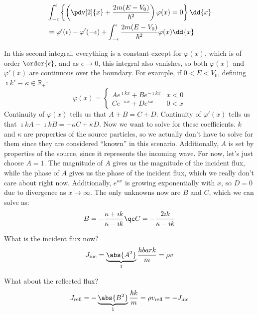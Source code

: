 \documentclass[a4paper,twoside,master.tex]{subfiles}
\begin{document}
\begin{align}\label{eq:barrier_integral}
    &\int_{-\epsilon}^{\epsilon} \left\{ \left(\pdv[2]{x} + \frac{2m(E-V_0)}{\hbar^2} \right) \varphi(x) = 0\right\} \dd{x}\\
    &= \varphi'(\epsilon) - \varphi'(-\epsilon) + \int_{- \epsilon}^{\epsilon} \frac{2m(E-V_0)}{\hbar^2} \varphi(x) \dd{x}
\end{align}

In this second integral, everything is a constant except for $ \varphi(x) $, which is of order $ \order{\epsilon} $, and as $ \epsilon \to 0 $, this integral also vanishes, so both $ \varphi(x) $ and $ \varphi'(x) $ are continuous over the boundary. For example, if $ 0 < E < V_0 $, defining $ \imath k' \equiv \kappa \in \mathbb{R}_+ $:
\begin{equation}
    \varphi(x) = 
    \begin{cases}
        A e^{\imath k x} + B e^{-\imath k x} & x<0\\
        C e^{-\kappa x} + D e^{\kappa x} & 0 < x
    \end{cases}
\end{equation}
Continuity of $ \varphi(x) $ tells us that $ A+B = C+D $. Continuity of $ \varphi'(x) $ tells us that $ \imath k A - \imath k B = - \kappa C + \kappa D $. Now we want to solve for these coefficients. $ k $ and $ \kappa $ are properties of the source particles, so we actually don't have to solve for them since they are considered ``known'' in this scenario. Additionally, $ A $ is set by properties of the source, since it represents the incoming wave. For now, let's just choose $ A = 1 $. The magnitude of $ A $ gives us the magnitude of the incident flux, while the phase of $ A $ gives us the phase of the incident flux, which we really don't care about right now. Additionally, $ e^{\kappa x} $ is growing exponentially with $ x $, so $ D = 0 $ due to divergence as $ x \to \infty $. The only unknowns now are $ B $ and $ C $, which we can solve as:
\begin{equation}
    B = - \frac{\kappa + \imath k}{\kappa - \imath k} \qc C = - \frac{2\imath k}{\kappa - \imath k}
\end{equation}

What is the incident flux now?
\begin{equation}
    J_{\text{inc}} = \underbrace{\abs{A^2}}_{1} \frac{hbar k}{m} = \rho v
\end{equation}

What about the reflected flux?
\begin{equation}
    J_{\text{refl}} = - \underbrace{\abs{B^2}}_{1} \frac{\hbar k}{m} = \rho v_{\text{refl}} = - J_{\text{inc}}
\end{equation}
\end{document}
